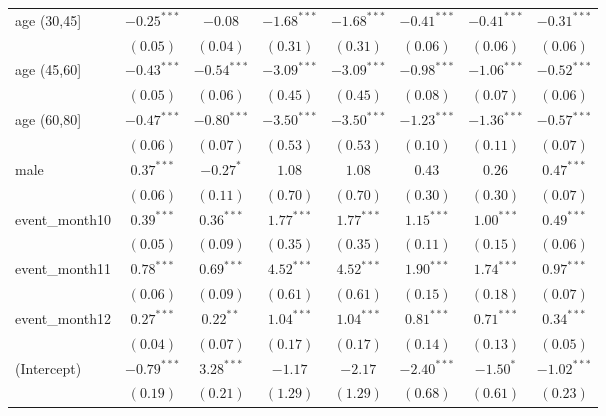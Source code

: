 \begin{table}
\begin{center}
\begin{tabular}{l c c c c c c c}
age (30,45]    & $-0.25^{***}$ & $-0.08$       & $-1.68^{***}$ & $-1.68^{***}$ & $-0.41^{***}$ & $-0.41^{***}$ & $-0.31^{***}$ \\
               & $(0.05)$      & $(0.04)$      & $(0.31)$      & $(0.31)$      & $(0.06)$      & $(0.06)$      & $(0.06)$      \\
age (45,60]    & $-0.43^{***}$ & $-0.54^{***}$ & $-3.09^{***}$ & $-3.09^{***}$ & $-0.98^{***}$ & $-1.06^{***}$ & $-0.52^{***}$ \\
               & $(0.05)$      & $(0.06)$      & $(0.45)$      & $(0.45)$      & $(0.08)$      & $(0.07)$      & $(0.06)$      \\
age (60,80]    & $-0.47^{***}$ & $-0.80^{***}$ & $-3.50^{***}$ & $-3.50^{***}$ & $-1.23^{***}$ & $-1.36^{***}$ & $-0.57^{***}$ \\
               & $(0.06)$      & $(0.07)$      & $(0.53)$      & $(0.53)$      & $(0.10)$      & $(0.11)$      & $(0.07)$      \\
male           & $0.37^{***}$  & $-0.27^{*}$   & $1.08$        & $1.08$        & $0.43$        & $0.26$        & $0.47^{***}$  \\
               & $(0.06)$      & $(0.11)$      & $(0.70)$      & $(0.70)$      & $(0.30)$      & $(0.30)$      & $(0.07)$      \\
event\_month10 & $0.39^{***}$  & $0.36^{***}$  & $1.77^{***}$  & $1.77^{***}$  & $1.15^{***}$  & $1.00^{***}$  & $0.49^{***}$  \\
               & $(0.05)$      & $(0.09)$      & $(0.35)$      & $(0.35)$      & $(0.11)$      & $(0.15)$      & $(0.06)$      \\
event\_month11 & $0.78^{***}$  & $0.69^{***}$  & $4.52^{***}$  & $4.52^{***}$  & $1.90^{***}$  & $1.74^{***}$  & $0.97^{***}$  \\
               & $(0.06)$      & $(0.09)$      & $(0.61)$      & $(0.61)$      & $(0.15)$      & $(0.18)$      & $(0.07)$      \\
event\_month12 & $0.27^{***}$  & $0.22^{**}$   & $1.04^{***}$  & $1.04^{***}$  & $0.81^{***}$  & $0.71^{***}$  & $0.34^{***}$  \\
               & $(0.04)$      & $(0.07)$      & $(0.17)$      & $(0.17)$      & $(0.14)$      & $(0.13)$      & $(0.05)$      \\
(Intercept)    & $-0.79^{***}$ & $3.28^{***}$  & $-1.17$       & $-2.17$       & $-2.40^{***}$ & $-1.50^{*}$   & $-1.02^{***}$ \\
               & $(0.19)$      & $(0.21)$      & $(1.29)$      & $(1.29)$      & $(0.68)$      & $(0.61)$      & $(0.23)$      \\

\end{tabular}
\end{center}
\end{table}
